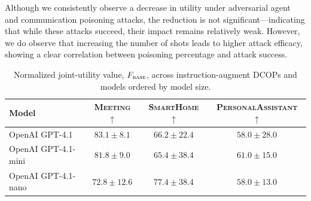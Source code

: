 Although we consistently observe a decrease in utility under adversarial agent and communication poisoning attacks, the reduction is not significant—indicating that while these attacks succeed, their impact remains relatively weak. However, we do observe that increasing the number of shots leads to higher attack efficacy, showing a clear correlation between poisoning percentage and attack success.

\begin{table}[t]
  \centering
  \small
  \setlength\tabcolsep{6pt}
  \renewcommand{\arraystretch}{1.0}
  \begin{tabular}{@{}lccc@{}}
    \toprule
    \textbf{Model} &
    \textsc{Meeting $\uparrow$} &
    \textsc{SmartHome $\uparrow$} &
    \textsc{PersonalAssistant $\uparrow$} \\
    \midrule
    OpenAI GPT-4.1
      & $83.1 \pm 8.1$
      & $66.2 \pm 22.4$
      & $58.0 \pm 28.0$ \\
    \midrule
    OpenAI GPT-4.1-mini
      & $81.8 \pm 9.0$
      & $65.4 \pm 38.4$
      & $61.0 \pm 15.0$ \\
    \midrule
    OpenAI GPT-4.1-nano
      & $72.8 \pm 12.6$
      & $77.4 \pm 38.4$
      & $58.0 \pm 13.0$ \\
    \bottomrule
  \end{tabular}
  \caption{Normalized joint-utility value, $F_{\textsc{base}}$, across instruction-augment DCOPs and models ordered by model size.}
  \label{tab:baselines}
\end{table}



